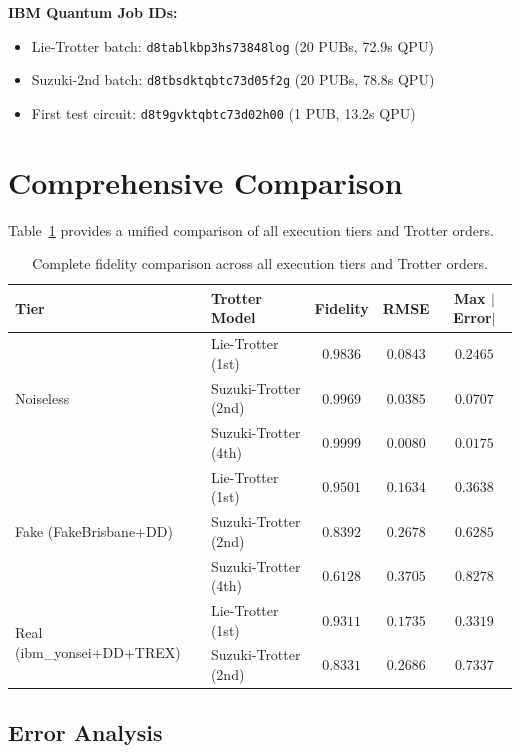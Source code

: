 \documentclass[11pt,a4paper]{article}
\begin{document}
\textbf{IBM Quantum Job IDs:}
\begin{itemize}
    \item Lie-Trotter batch: \texttt{d8tablkbp3hs73848log} (20 PUBs, 72.9s QPU)
    \item Suzuki-2nd batch: \texttt{d8tbsdktqbtc73d05f2g} (20 PUBs, 78.8s QPU)
    \item First test circuit: \texttt{d8t9gvktqbtc73d02h00} (1 PUB, 13.2s QPU)
\end{itemize}

\section{Comprehensive Comparison}

Table~\ref{tab:all_metrics} provides a unified comparison of all execution tiers and Trotter orders.

\begin{table}[H]
\centering
\caption{Complete fidelity comparison across all execution tiers and Trotter orders.}
\label{tab:all_metrics}
\begin{tabular}{llccc}
\toprule
Tier & Trotter Model & Fidelity & RMSE & Max $|$Error$|$ \\
\midrule
\multirow{3}{*}{Noiseless}
& Lie-Trotter (1st) & $0.9836$ & $0.0843$ & $0.2465$ \\
& Suzuki-Trotter (2nd) & $0.9969$ & $0.0385$ & $0.0707$ \\
& Suzuki-Trotter (4th) & $0.9999$ & $0.0080$ & $0.0175$ \\
\midrule
\multirow{3}{*}{Fake (FakeBrisbane+DD)}
& Lie-Trotter (1st) & $0.9501$ & $0.1634$ & $0.3638$ \\
& Suzuki-Trotter (2nd) & $0.8392$ & $0.2678$ & $0.6285$ \\
& Suzuki-Trotter (4th) & $0.6128$ & $0.3705$ & $0.8278$ \\
\midrule
\multirow{2}{*}{Real (ibm\_yonsei+DD+TREX)}
& Lie-Trotter (1st) & $0.9311$ & $0.1735$ & $0.3319$ \\
& Suzuki-Trotter (2nd) & $0.8331$ & $0.2686$ & $0.7337$ \\
\bottomrule
\end{tabular}
\end{table}

\subsection{Error Analysis}
\end{document}
